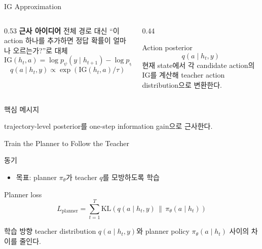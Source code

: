 \documentclass[11pt,notheorems,hyperref={pdfauthor=whatever}]{beamer}
\newcommand{\keymessage}[1]{%
  \begin{block}{핵심 메시지}
  \centering\footnotesize\bfseries\parbox{0.92\linewidth}{\centering #1}
  \end{block}
}
\begin{document}
\begin{frame}[t]{IG Approximation}
\footnotesize
\begin{columns}[T,onlytextwidth]
\begin{column}{0.53\textwidth}
\textcolor{AccentOrange}{\bfseries 근사 아이디어}\quad
\scriptsize 전체 경로 대신 ``이 action 하나를 추가하면 정답 확률이 얼마나 오르는가?''로 대체
\vspace{0.15em}
\centering
\large
\[
\mathrm{IG}(h_t,a)=
\log p_\psi(y\mid h_{t+1})
-\log p_\psi(y\mid h_t)
\]
\vspace{-0.4em}
\[
q(a\mid h_t,y)\propto
\exp(\mathrm{IG}(h_t,a)/\tau)
\]
\end{column}
\begin{column}{0.44\textwidth}
\begin{block}{Action posterior}
\centering
\large
\[
q(a\mid h_t,y)
\]
\vspace{-0.3em}
\footnotesize
현재 state에서 각 candidate action의 IG를 계산해 teacher action distribution으로 변환한다.
\end{block}
\end{column}
\end{columns}
\vspace{-0.05em}
\keymessage{trajectory-level posterior를 one-step information gain으로 근사한다.}
\end{frame}

\begin{frame}[t]{Train the Planner to Follow the Teacher}
\small
\begin{block}{동기}
\begin{itemize}
  \item 목표: planner \(\pi_\theta\)가 teacher \(q\)를 모방하도록 학습
\end{itemize}
\end{block}
\vspace{0.2em}
\begin{alertblock}{Planner loss}
\centering
\large
\[
L_{\mathrm{planner}}=
\sum_{t=1}^{T}
\mathrm{KL}\!\left(
q(a\mid h_t,y)\,\|\,\pi_\theta(a\mid h_t)
\right)
\]
\end{alertblock}
\vspace{0.25em}
\begin{block}{학습 방향}
\footnotesize
teacher distribution \(q(a\mid h_t,y)\)와 planner policy \(\pi_\theta(a\mid h_t)\) 사이의 차이를 줄인다.
\end{block}
\end{frame}
\end{document}
